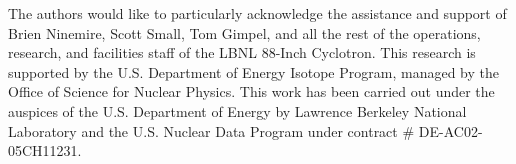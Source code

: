 \documentclass[onecolumn,epjc3]{svjour3}
\begin{document}









\begin{acknowledgements}
 
 
The authors would like to particularly acknowledge the assistance and support of  Brien Ninemire, Scott Small, Tom Gimpel, and all the rest of the operations, research, and facilities staff of the LBNL 88-Inch Cyclotron.
This research is supported by the U.S. Department of Energy Isotope Program, managed by the Office of Science for  Nuclear Physics.
This work has been carried out  under the auspices of the U.S. Department of Energy by  Lawrence Berkeley National Laboratory and the U.S. Nuclear Data Program under contract \# DE-AC02-05CH11231.




 

\end{acknowledgements}
\end{document}
